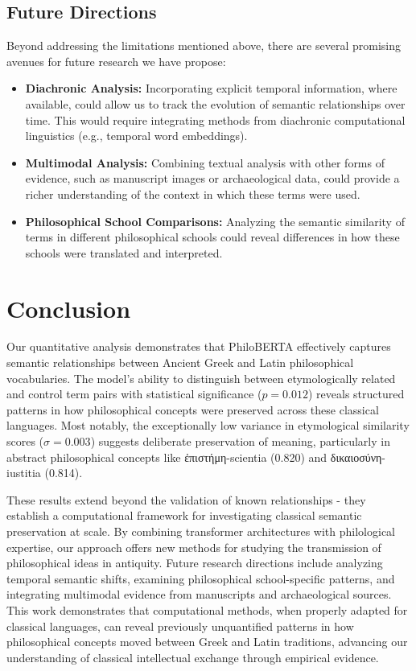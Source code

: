 \documentclass[11pt]{article} %
\begin{document}
\subsection*{Future Directions}

Beyond addressing the limitations mentioned above, there are several promising avenues for future research we have propose:

\begin{itemize}
    \item \textbf{Diachronic Analysis:} Incorporating explicit temporal information, where available, could allow us to track the evolution of semantic relationships over time. This would require integrating methods from diachronic computational linguistics (e.g., temporal word embeddings).
    \item \textbf{Multimodal Analysis:} Combining textual analysis with other forms of evidence, such as manuscript images or archaeological data, could provide a richer understanding of the context in which these terms were used.
    \item \textbf{Philosophical School Comparisons:} Analyzing the semantic similarity of terms in different philosophical schools could reveal differences in how these schools were translated and interpreted.
\end{itemize}

\section{Conclusion}
Our quantitative analysis demonstrates that PhiloBERTA effectively captures semantic relationships between Ancient Greek and Latin philosophical vocabularies. The model's ability to distinguish between etymologically related and control term pairs with statistical significance ($p=0.012$) reveals structured patterns in how philosophical concepts were preserved across these classical languages. Most notably, the exceptionally low variance in etymological similarity scores ($\sigma = 0.003$) suggests deliberate preservation of meaning, particularly in abstract philosophical concepts like \textgreek{ἐπιστήμη}-scientia (0.820) and \textgreek{δικαιοσύνη}-iustitia (0.814).

These results extend beyond the validation of known relationships - they establish a computational framework for investigating classical semantic preservation at scale. By combining transformer architectures with philological expertise, our approach offers new methods for studying the transmission of philosophical ideas in antiquity. Future research directions include analyzing temporal semantic shifts, examining philosophical school-specific patterns, and integrating multimodal evidence from manuscripts and archaeological sources. This work demonstrates that computational methods, when properly adapted for classical languages, can reveal previously unquantified patterns in how philosophical concepts moved between Greek and Latin traditions, advancing our understanding of classical intellectual exchange through empirical evidence.
\end{document}
